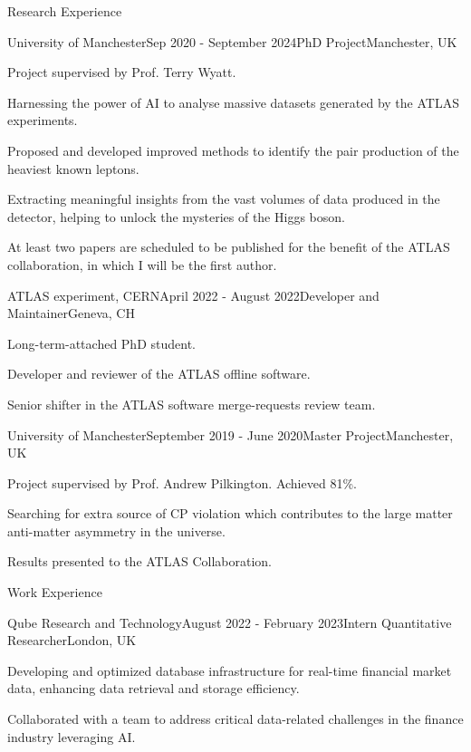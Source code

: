 \documentclass{resume} %
\begin{document}
    \begin{rSection}{Research Experience}
        \begin{rSubsection}{University of Manchester}{Sep 2020 - September 2024}{PhD Project}{Manchester, UK}
            \item Project supervised by Prof. Terry Wyatt.
            \item Harnessing the power of AI to analyse massive datasets generated by the ATLAS experiments. 
            \item Proposed and developed improved methods to identify the pair production of the heaviest known leptons.
            \item Extracting meaningful insights from the vast volumes of data produced in the detector, helping to unlock the mysteries of the Higgs boson.
            \item At least two papers are scheduled to be published for the benefit of the ATLAS collaboration, in which I will be the first author.
        \end{rSubsection}
        \begin{rSubsection}{ATLAS experiment, CERN}{April 2022 - August 2022}{Developer and Maintainer}{Geneva, CH}
            \item Long-term-attached PhD student.
            \item Developer and reviewer of the ATLAS offline software.
            \item Senior shifter in the ATLAS software merge-requests review team.
        \end{rSubsection}
        \begin{rSubsection}{University of Manchester}{September 2019 - June 2020}{Master Project}{Manchester, UK}
            \item   Project supervised by Prof. Andrew Pilkington. Achieved 81\%.
            \item   Searching for extra source of CP violation which contributes to the large matter anti-matter asymmetry in the universe.
            \item   Results presented to the ATLAS Collaboration. 
        \end{rSubsection}
    \end{rSection}


    \begin{rSection}{Work Experience}
        \begin{rSubsection}{Qube Research and Technology}{August 2022 - February 2023}{Intern Quantitative Researcher}{London, UK}
            \item Developing and optimized database infrastructure for real-time financial market data, enhancing data retrieval and storage efficiency.
            \item Collaborated with a team to address critical data-related challenges in the finance industry leveraging AI.
        \end{rSubsection}
    \end{rSection}
\end{document}

